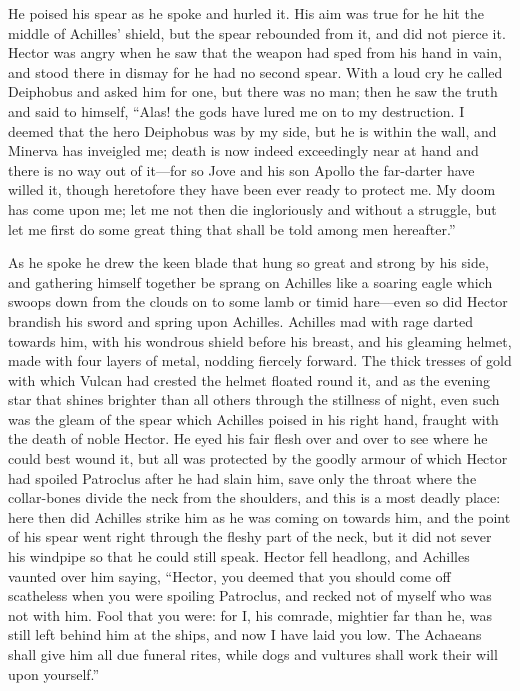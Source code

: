 He poised his spear as he spoke and hurled it. His aim was true for he hit
the middle of Achilles’ shield, but the spear rebounded from it, and did
not pierce it. Hector was angry when he saw that the weapon had sped from
his hand in vain, and stood there in dismay for he had no second spear.
With a loud cry he called Deiphobus and asked him for one, but there was
no man; then he saw the truth and said to himself, “Alas! the gods have
lured me on to my destruction. I deemed that the hero Deiphobus was by my
side, but he is within the wall, and Minerva has inveigled me; death is
now indeed exceedingly near at hand and there is no way out of it—for
so Jove and his son Apollo the far-darter have willed it, though
heretofore they have been ever ready to protect me. My doom has come upon
me; let me not then die ingloriously and without a struggle, but let me
first do some great thing that shall be told among men hereafter.”

As he spoke he drew the keen blade that hung so great and strong by his
side, and gathering himself together be sprang on Achilles like a soaring
eagle which swoops down from the clouds on to some lamb or timid hare—even
so did Hector brandish his sword and spring upon Achilles. Achilles mad
with rage darted towards him, with his wondrous shield before his breast,
and his gleaming helmet, made with four layers of metal, nodding fiercely
forward. The thick tresses of gold with which Vulcan had crested the
helmet floated round it, and as the evening star that shines brighter than
all others through the stillness of night, even such was the gleam of the
spear which Achilles poised in his right hand, fraught with the death of
noble Hector. He eyed his fair flesh over and over to see where he could
best wound it, but all was protected by the goodly armour of which Hector
had spoiled Patroclus after he had slain him, save only the throat where
the collar-bones divide the neck from the shoulders, and this is a most
deadly place: here then did Achilles strike him as he was coming on
towards him, and the point of his spear went right through the fleshy part
of the neck, but it did not sever his windpipe so that he could still
speak. Hector fell headlong, and Achilles vaunted over him saying,
“Hector, you deemed that you should come off scatheless when you were
spoiling Patroclus, and recked not of myself who was not with him. Fool
that you were: for I, his comrade, mightier far than he, was still left
behind him at the ships, and now I have laid you low. The Achaeans shall
give him all due funeral rites, while dogs and vultures shall work their
will upon yourself.”

